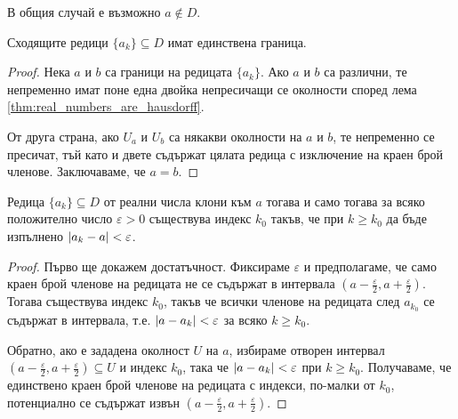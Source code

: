 \documentclass[numbers=endperiod, bibliography=totocnumbered]{scrartcl}
\begin{document}
\begin{remark}
  В общия случай е възможно \( a \not\in D \).
\end{remark}

\begin{proposition}
  Сходящите редици \( \{ a_k \} \subseteq D \) имат единствена граница.
\end{proposition}
\begin{proof}
  Нека \( a \) и \( b \) са граници на редицата \( \{ a_k \} \). Ако \( a \) и \( b \) са различни, те непременно имат поне една двойка непресичащи се околности според лема \ref{thm:real_numbers_are_hausdorff}.

  От друга страна, ако \( U_a \) и \( U_b \) са някакви околности на \( a \) и \( b \), те непременно се пресичат, тъй като и двете съдържат цялата редица с изключение на краен брой членове. Заключаваме, че \( a = b \).
\end{proof}

\begin{proposition}\label{thm:sequence_converges_in_topology_iff_converges_in_base}
  Редица \( \{ a_k \} \subseteq D \) от реални числа клони към \( a \) тогава и само тогава за всяко положително число \( \varepsilon > 0 \) съществува индекс \( k_0 \) такъв, че при \( k \geq k_0 \) да бъде изпълнено \( \left\vert a_k - a \right\vert < \varepsilon \).
\end{proposition}
\begin{proof}
  Първо ще докажем достатъчност. Фиксираме \( \varepsilon \) и предполагаме, че само краен брой членове на редицата не се съдържат в интервала \( (a - \tfrac{\varepsilon} 2, a + \tfrac{\varepsilon} 2) \). Тогава съществува индекс \( k_0 \), такъв че всички членове на редицата след \( a_{k_0} \) се съдържат в интервала, т.е. \( \left\vert a - a_k \right\vert < \varepsilon \) за всяко \( k \geq k_0 \).

  Обратно, ако е зададена околност \( U \) на \( a \), избираме отворен интервал \( (a - \tfrac \varepsilon 2, a + \tfrac \varepsilon 2) \subseteq U \) и индекс \( k_0 \), така че \( \left\vert a - a_k \right\vert < \varepsilon \) при \( k \geq k_0 \). Получаваме, че единствено краен брой членове на редицата с индекси, по-малки от \( k_0 \), потенциално се съдържат извън \( (a - \tfrac \varepsilon 2, a + \tfrac \varepsilon 2) \).
\end{proof}
\end{document}
